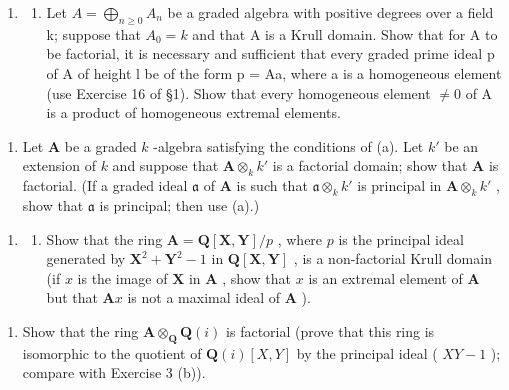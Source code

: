 \begin{enumerate}
\def\labelenumi{\arabic{enumi}.}
\setcounter{enumi}{2}
\tightlist
\item
  \begin{enumerate}
  \def\labelenumii{(\alph{enumii})}
  \tightlist
  \item
    Let \(A = \bigoplus_{n \geqslant 0} A_n\) be a graded algebra with positive degrees over a field k; suppose that \(A_0 = k\) and that A is a Krull domain. Show that for A to be factorial, it is necessary and sufficient that every graded prime ideal p of A of height l be of the form p = Aa, where a is a homogeneous element (use Exercise 16 of §1). Show that every homogeneous element \(\neq 0\) of A is a product of homogeneous extremal elements.
  \end{enumerate}
\end{enumerate}

\begin{enumerate}
\def\labelenumi{(\alph{enumi})}
\setcounter{enumi}{1}
\tightlist
\item
  Let \(\mathbf{A}\) be a graded \(k\) -algebra satisfying the conditions of (a). Let \(k'\) be an extension of \(k\) and suppose that \(\mathbf{A} \otimes_k k'\) is a factorial domain; show that \(\mathbf{A}\) is factorial. (If a graded ideal \(\mathfrak{a}\) of \(\mathbf{A}\) is such that \(\mathfrak{a} \otimes_k k'\) is principal in \(\mathbf{A} \otimes_k k'\) , show that \(\mathfrak{a}\) is principal; then use (a).)
\end{enumerate}

\begin{enumerate}
\def\labelenumi{\arabic{enumi}.}
\setcounter{enumi}{3}
\tightlist
\item
  \begin{enumerate}
  \def\labelenumii{(\alph{enumii})}
  \tightlist
  \item
    Show that the ring \(\mathbf{A} = \mathbf{Q}[\mathbf{X},\mathbf{Y}] / p\) , where \(p\) is the principal ideal generated by \(\mathbf{X}^2 +\mathbf{Y}^2 -1\) in \(\mathbf{Q}[\mathbf{X},\mathbf{Y}]\) , is a non-factorial Krull domain (if \(x\) is the image of \(\mathbf{X}\) in \(\mathbf{A}\) , show that \(x\) is an extremal element of \(\mathbf{A}\) but that \(\mathbf{A}x\) is not a maximal ideal of \(\mathbf{A}\) ).
  \end{enumerate}
\end{enumerate}

\begin{enumerate}
\def\labelenumi{(\alph{enumi})}
\setcounter{enumi}{1}
\tightlist
\item
  Show that the ring \(\mathbf{A} \otimes_{\mathbf{Q}} \mathbf{Q}(i)\) is factorial (prove that this ring is isomorphic to the quotient of \(\mathbf{Q}(i) [X, Y]\) by the principal ideal ( \(XY - 1\) ); compare with Exercise 3 (b)).
\end{enumerate}

